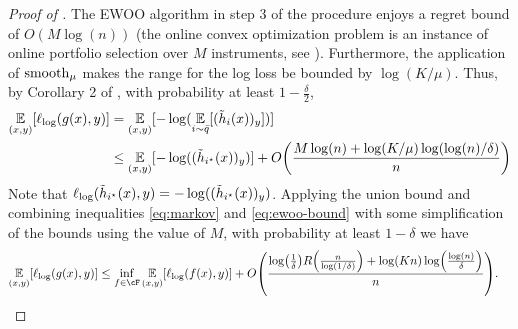 \begin{proof}[Proof of ]
The EWOO algorithm in step 3 of the procedure enjoys a regret bound of $O(M\log(n))$ (the online convex	optimization problem is an instance of online portfolio selection over $M$ instruments, see \citep{hazan2007logarithmic}).  Furthermore, the application of $\mathrm{smooth}_{\mu}$ makes the range for the log loss be bounded by $\log(K/\mu)$. Thus, by Corollary 2 of \cite{mehta2016fast}, with probability at least $1-\frac{\delta}{2}$,
\begin{align}
\En_{(x, y)}[\ls_{\text{log}}(g(x), y)] &= \En_{(x, y)}[-\log(\En_{i \sim \bar{q}}[(\tilde{h}_i(x))_y])] \notag\\ 
&\leq \En_{(x, y)}[-\log((\tilde{h}_{i^\star}(x))_y)] + O\prn*{\frac{M\log(n) + \log(K/\mu)\log(\log(n)/\delta)}{n}} \label{eq:ewoo-bound}
\end{align}
Note that $\ell_\text{log}(\tilde{h}_{i^\star}(x), y) = -\log((\tilde{h}_{i^\star}(x))_y)$. Applying the union bound and combining inequalities \eqref{eq:markov} and \eqref{eq:ewoo-bound} with some simplification of the bounds using the value of $M$, with probability at least $1-\delta$ we have
\begin{align*}
\En_{(x, y)}[\ls_{\text{log}}(g(x), y)] &\leq \inf_{f \in \cF} \En_{(x, y)}[\ls_\text{log}(f(x), y)] + O\prn*{\frac{\log\prn*{\frac{1}{\delta}}R\prn*{\frac{n}{\log(1/\delta)}} + \log(Kn)\log\prn*{\frac{\log(n)}{\delta}}}{n}}.
\end{align*}
\end{proof}


